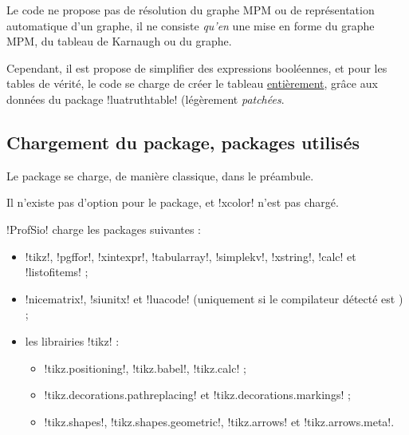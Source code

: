 \documentclass[french,a4paper,11pt]{article}
\begin{document}
{{\begin{warningblock}
Le code ne propose pas de \og résolution \fg{} du graphe MPM ou de représentation \og automatique \fg{} d'un graphe, il ne consiste \textit{qu'en} une mise en forme du graphe MPM, du tableau de Karnaugh ou du graphe.

\smallskip

Cependant, il est propose de \og simplifier \fg{} des expressions booléennes, et pour les tables de vérité, le code se charge de créer le tableau \underline{entièrement}, grâce aux données du package \packagetex!luatruthtable! (légèrement \textit{patchées}.
\end{warningblock}

\subsection{Chargement du package, packages utilisés}

\begin{importantblock}
Le package se charge, de manière classique, dans le préambule.

Il n'existe pas d'option pour le package, et \packagetex!xcolor! n'est pas chargé.
\end{importantblock}


\begin{noteblock}
\packagetex!ProfSio! charge les packages suivantes :

\begin{itemize}
	\item \packagetex!tikz!, \packagetex!pgffor!, \packagetex!xintexpr!, \packagetex!tabularray!, \packagetex!simplekv!, \packagetex!xstring!, \packagetex!calc! et \packagetex!listofitems! ;
	\item \packagetex!nicematrix!, \packagetex!siunitx! et \packagetex!luacode! (uniquement si le compilateur détecté est ) ;
	\item les librairies \packagetex!tikz! :
	\begin{itemize}
		\item \motcletex!tikz.positioning!, \motcletex!tikz.babel!, \motcletex!tikz.calc! ;
		\item \motcletex!tikz.decorations.pathreplacing! et \motcletex!tikz.decorations.markings! ;
		\item \motcletex!tikz.shapes!, \motcletex!tikz.shapes.geometric!, \motcletex!tikz.arrows! et \motcletex!tikz.arrows.meta!.
	\end{itemize}
\end{itemize}


\end{noteblock}}}
\end{document}
